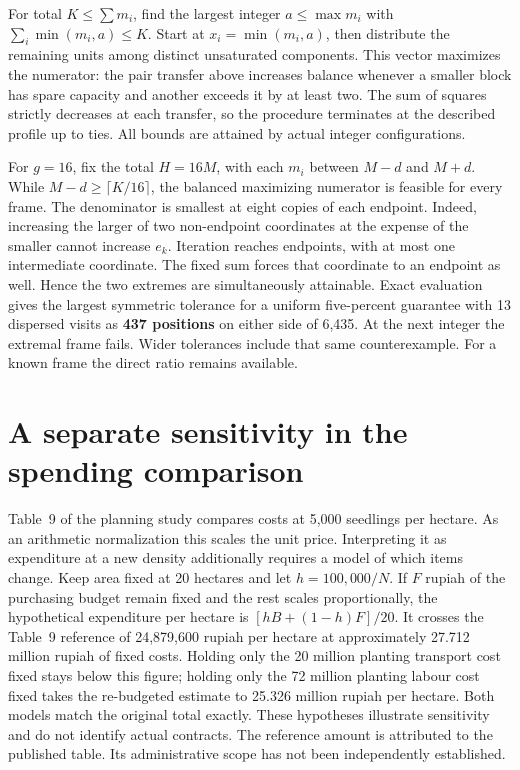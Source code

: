 \documentclass[10pt]{article}
\begin{document}
For total $K\leq\sum m_i$, find the largest integer $a\leq\max m_i$ with $\sum_i\min(m_i,a)\leq K$. Start at $x_i=\min(m_i,a)$, then distribute the remaining units among distinct unsaturated components. This vector maximizes the numerator: the pair transfer above increases balance whenever a smaller block has spare capacity and another exceeds it by at least two. The sum of squares strictly decreases at each transfer, so the procedure terminates at the described profile up to ties. All bounds are attained by actual integer configurations.

For $g=16$, fix the total $H=16M$, with each $m_i$ between $M-d$ and $M+d$. While $M-d\geq\lceil K/16\rceil$, the balanced maximizing numerator is feasible for every frame. The denominator is smallest at eight copies of each endpoint. Indeed, increasing the larger of two non-endpoint coordinates at the expense of the smaller cannot increase $e_k$. Iteration reaches endpoints, with at most one intermediate coordinate. The fixed sum forces that coordinate to an endpoint as well. Hence the two extremes are simultaneously attainable. Exact evaluation gives the largest symmetric tolerance for a uniform five-percent guarantee with 13 dispersed visits as \textbf{437 positions} on either side of 6,435. At the next integer the extremal frame fails. Wider tolerances include that same counterexample. For a known frame the direct ratio remains available.

\section{A separate sensitivity in the spending comparison}
Table~9 of the planning study compares costs at 5,000 seedlings per hectare. As an arithmetic normalization this scales the unit price. Interpreting it as expenditure at a new density additionally requires a model of which items change. Keep area fixed at 20 hectares and let $h=100{,}000/N$. If $F$ rupiah of the purchasing budget remain fixed and the rest scales proportionally, the hypothetical expenditure per hectare is $[hB+(1-h)F]/20$. It crosses the Table~9 reference of 24,879,600 rupiah per hectare at approximately 27.712 million rupiah of fixed costs. Holding only the 20 million planting transport cost fixed stays below this figure; holding only the 72 million planting labour cost fixed takes the re-budgeted estimate to 25.326 million rupiah per hectare. Both models match the original total exactly. These hypotheses illustrate sensitivity and do not identify actual contracts. The reference amount is attributed to the published table. Its administrative scope has not been independently established.
\end{document}
